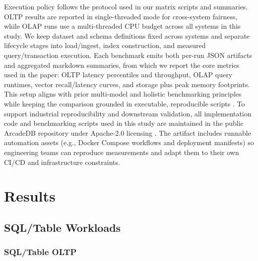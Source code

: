 \documentclass[sigconf, nonacm]{acmart}
\begin{document}
Execution policy follows the protocol used in our matrix scripts and summaries. OLTP results are reported in single-threaded mode for cross-system fairness, while OLAP runs use a multi-threaded CPU budget across all systems in this study. We keep dataset and schema definitions fixed across systems and separate lifecycle stages into load/ingest, index construction, and measured query/transaction execution. Each benchmark emits both per-run JSON artifacts and aggregated markdown summaries, from which we report the core metrics used in the paper: OLTP latency percentiles and throughput, OLAP query runtimes, vector recall/latency curves, and storage plus peak memory footprints. This setup aligns with prior multi-model and holistic benchmarking principles while keeping the comparison grounded in executable, reproducible scripts \cite{Zhang_2019_Unibench,Kim_2022,Zhang_2019_Holistic}.
To support industrial reproducibility and downstream validation, all implementation code and benchmarking scripts used in this study are maintained in the public ArcadeDB repository under Apache-2.0 licensing \cite{arcadedb_repo}. The artifact includes runnable automation assets (e.g., Docker Compose workflows and deployment manifests) so engineering teams can reproduce measurements and adapt them to their own CI/CD and infrastructure constraints.


\section{Results}

\subsection{SQL/Table Workloads}

\subsubsection{SQL/Table OLTP}

\begin{table}[tb]
  \centering
  \caption{SQL table OLTP (single-threaded, Stack Overflow dataset, mean over 3 runs).}
  \label{tab:sql-table-oltp-medium}
  \small
\end{table}
\end{document}
